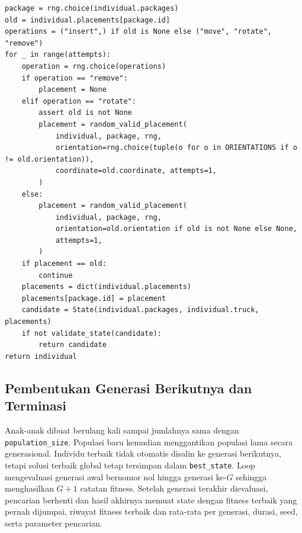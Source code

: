 \begin{lstlisting}[caption={Memilih satu paket dan jenis mutasinya},label={lst:ga-mutation-operator}]
package = rng.choice(individual.packages)
old = individual.placements[package.id]
operations = ("insert",) if old is None else ("move", "rotate", "remove")
for _ in range(attempts):
    operation = rng.choice(operations)
    if operation == "remove":
        placement = None
    elif operation == "rotate":
        assert old is not None
        placement = random_valid_placement(
            individual, package, rng,
            orientation=rng.choice(tuple(o for o in ORIENTATIONS if o != old.orientation)),
            coordinate=old.coordinate, attempts=1,
        )
    else:
        placement = random_valid_placement(
            individual, package, rng,
            orientation=old.orientation if old is not None else None,
            attempts=1,
        )
    if placement == old:
        continue
    placements = dict(individual.placements)
    placements[package.id] = placement
    candidate = State(individual.packages, individual.truck, placements)
    if not validate_state(candidate):
        return candidate
return individual
\end{lstlisting}

\subsection{Pembentukan Generasi Berikutnya dan Terminasi}

Anak-anak dibuat berulang kali sampai jumlahnya sama dengan \texttt{population\_size}. Populasi baru kemudian menggantikan populasi lama secara generasional. Individu terbaik tidak otomatis disalin ke generasi berikutnya, tetapi solusi terbaik global tetap tersimpan dalam \texttt{best\_state}. Loop mengevaluasi generasi awal bernomor nol hingga generasi ke-$G$ sehingga menghasilkan $G+1$ catatan fitness. Setelah generasi terakhir dievaluasi, pencarian berhenti dan hasil akhirnya memuat state dengan fitness terbaik yang pernah dijumpai, riwayat fitness terbaik dan rata-rata per generasi, durasi, seed, serta parameter pencarian.

